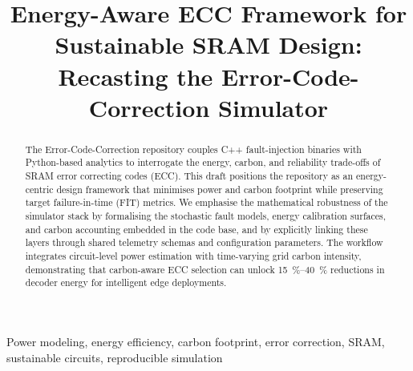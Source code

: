 \documentclass[conference]{IEEEtran}
\begin{document}
\title{Energy-Aware ECC Framework for Sustainable SRAM Design: Recasting the Error-Code-Correction Simulator}

\author{
}

\maketitle

\begin{abstract}
The Error-Code-Correction repository couples C++ fault-injection binaries with Python-based analytics to interrogate the energy, carbon, and reliability trade-offs of SRAM error correcting codes (ECC).
This draft positions the repository as an energy-centric design framework that minimises power and carbon footprint while preserving target failure-in-time (FIT) metrics.
We emphasise the mathematical robustness of the simulator stack by formalising the stochastic fault models, energy calibration surfaces, and carbon accounting embedded in the code base, and by explicitly linking these layers through shared telemetry schemas and configuration parameters.
The workflow integrates circuit-level power estimation with time-varying grid carbon intensity, demonstrating that carbon-aware ECC selection can unlock \SIrange{15}{40}{\percent} reductions in decoder energy for intelligent edge deployments.
\end{abstract}

\begin{IEEEkeywords}
Power modeling, energy efficiency, carbon footprint, error correction, SRAM, sustainable circuits, reproducible simulation
\end{IEEEkeywords}
\end{document}
